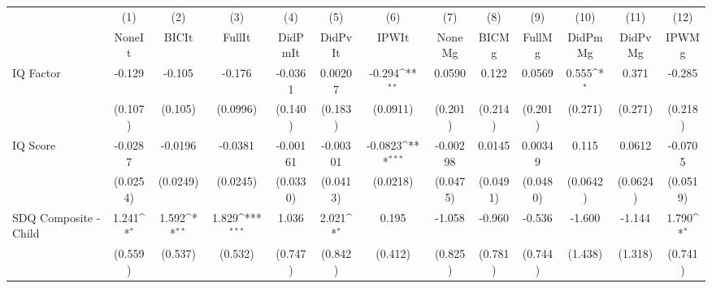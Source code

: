 {
\def\sym#1{\ifmmode^{#1}\else\(^{#1}\)\fi}
\begin{tabular}{l*{12}{c}}
\toprule
            &\multicolumn{1}{c}{(1)}&\multicolumn{1}{c}{(2)}&\multicolumn{1}{c}{(3)}&\multicolumn{1}{c}{(4)}&\multicolumn{1}{c}{(5)}&\multicolumn{1}{c}{(6)}&\multicolumn{1}{c}{(7)}&\multicolumn{1}{c}{(8)}&\multicolumn{1}{c}{(9)}&\multicolumn{1}{c}{(10)}&\multicolumn{1}{c}{(11)}&\multicolumn{1}{c}{(12)}\\
            &\multicolumn{1}{c}{NoneIt}&\multicolumn{1}{c}{BICIt}&\multicolumn{1}{c}{FullIt}&\multicolumn{1}{c}{DidPmIt}&\multicolumn{1}{c}{DidPvIt}&\multicolumn{1}{c}{IPWIt}&\multicolumn{1}{c}{NoneMg}&\multicolumn{1}{c}{BICMg}&\multicolumn{1}{c}{FullMg}&\multicolumn{1}{c}{DidPmMg}&\multicolumn{1}{c}{DidPvMg}&\multicolumn{1}{c}{IPWMg}\\
\midrule
IQ Factor   &      -0.129         &      -0.105         &      -0.176         &     -0.0361         &     0.00207         &      -0.294\sym{**} &      0.0590         &       0.122         &      0.0569         &       0.555\sym{*}  &       0.371         &      -0.285         \\
            &     (0.107)         &     (0.105)         &    (0.0996)         &     (0.140)         &     (0.183)         &    (0.0911)         &     (0.201)         &     (0.214)         &     (0.201)         &     (0.271)         &     (0.271)         &     (0.218)         \\
\addlinespace
IQ Score    &     -0.0287         &     -0.0196         &     -0.0381         &    -0.00161         &    -0.00301         &     -0.0823\sym{***}&    -0.00298         &      0.0145         &     0.00349         &       0.115         &      0.0612         &     -0.0705         \\
            &    (0.0254)         &    (0.0249)         &    (0.0245)         &    (0.0330)         &    (0.0413)         &    (0.0218)         &    (0.0475)         &    (0.0491)         &    (0.0480)         &    (0.0642)         &    (0.0624)         &    (0.0519)         \\
\addlinespace
SDQ Composite - Child&       1.241\sym{*}  &       1.592\sym{**} &       1.829\sym{***}&       1.036         &       2.021\sym{*}  &       0.195         &      -1.058         &      -0.960         &      -0.536         &      -1.600         &      -1.144         &       1.790\sym{*}  \\
            &     (0.559)         &     (0.537)         &     (0.532)         &     (0.747)         &     (0.842)         &     (0.412)         &     (0.825)         &     (0.781)         &     (0.744)         &     (1.438)         &     (1.318)         &     (0.741)         \\

\end{tabular}}
